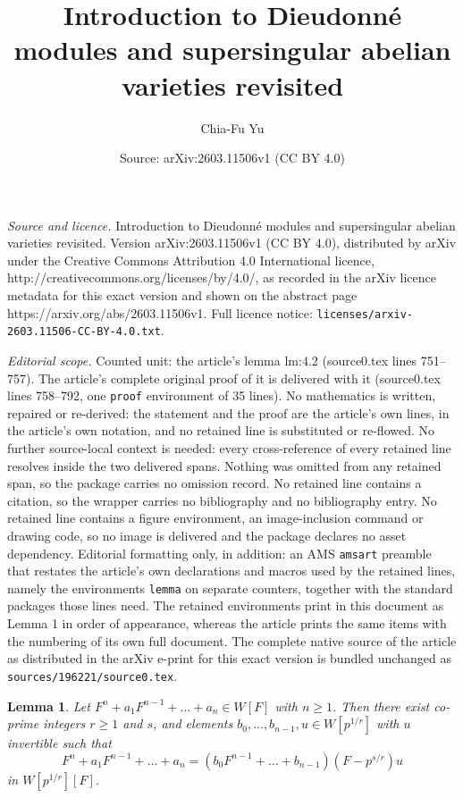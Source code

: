 \documentclass[10pt,a4paper]{amsart}
\title{Introduction to Dieudonn\'e modules and supersingular abelian varieties revisited}
\author{Chia-Fu Yu}
\date{Source: arXiv:2603.11506v1 (CC BY 4.0)}
\newtheorem{lemma}{Lemma}
\begin{document}
\maketitle

\noindent\emph{Source and licence.} Introduction to Dieudonn\'e modules and supersingular abelian varieties revisited. Version arXiv:2603.11506v1 (CC BY 4.0), distributed by arXiv under the Creative Commons Attribution 4.0 International licence, http://creativecommons.org/licenses/by/4.0/, as recorded in the arXiv licence metadata for this exact version and shown on the abstract page https://arxiv.org/abs/2603.11506v1. Full licence notice: \texttt{licenses/arxiv-2603.11506-CC-BY-4.0.txt}.\par\smallskip

\noindent\textit{Editorial scope.} Counted unit: the article's lemma lm:4.2 (source0.tex lines 751--757). The article's complete original proof of it is delivered with it (source0.tex lines 758--792, one \texttt{proof} environment of 35 lines). No mathematics is written, repaired or re-derived: the statement and the proof are the article's own lines, in the article's own notation, and no retained line is substituted or re-flowed.  No further source-local context is needed: every cross-reference of every retained line resolves inside the two delivered spans.  Nothing was omitted from any retained span, so the package carries no omission record.  No retained line contains a citation, so the wrapper carries no bibliography and no bibliography entry.  No retained line contains a figure environment, an image-inclusion command or drawing code, so no image is delivered and the package declares no asset dependency.  Editorial formatting only, in addition: an AMS \texttt{amsart} preamble that restates the article's own declarations and macros used by the retained lines, namely the environments \texttt{lemma} on separate counters, together with the standard packages those lines need.  The retained environments print in this document as Lemma 1 in order of appearance, whereas the article prints the same items with the numbering of its own full document.  The complete native source of the article as distributed in the arXiv e-print for this exact version is bundled unchanged as \texttt{sources/196221/source0.tex}.
\begin{lemma} \label{lm:4.2}
   Let $F^n+a_1 F^{n-1}+\dots +a_n\in W[F]$ with $n\ge 1$. Then there exist co-prime integers $r\ge 1$ and $s$, and elements $b_0,\dots ,b_{n-1}, u\in W[p^{1/r}]$ with $u$ invertible such that 
   \begin{equation}\label{eq:4.2}
       F^n+a_1 F^{n-1}+\dots +a_n=(b_0 F^{n-1}+\dots +b_{n-1})(F-p^{s/r}) u 
   \end{equation}
   in $W[p^{1/r}][F]$.
\end{lemma}
\end{document}
